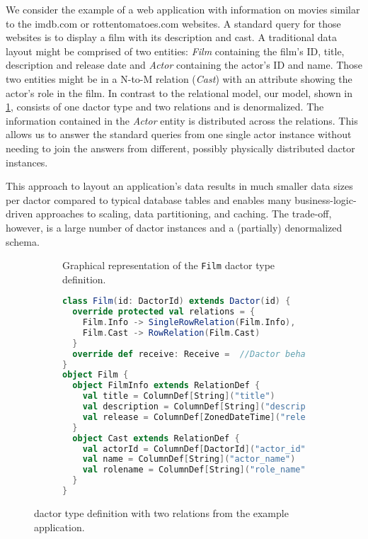     We consider the example of a web application with information on movies similar to the imdb.com or rottentomatoes.com websites.
    A standard query for those websites is to display a film with its description and cast.
    A traditional data layout might be comprised of two entities: \textit{Film} containing the film's ID, title, description and release date and \textit{Actor} containing the actor's ID and name.
    Those two entities might be in a N-to-M relation (\textit{Cast}) with an attribute showing the actor's role in the film.
    In contrast to the relational model, our model, shown in \cref{fig:film_diagram}, consists of one \gls{dactor} type and two \glspl{relation} and is denormalized.
    The information contained in the \textit{Actor} entity is distributed across the  \glspl{relation}.
    This allows us to answer the standard queries from one single actor instance without needing to join the answers from different, possibly physically distributed \gls{dactor} instances.

    This approach to layout an application's data results in much smaller data sizes per \gls{dactor} compared to typical database tables and enables many business-logic-driven approaches to scaling, data partitioning, and caching.
    The trade-off, however, is a large number of \gls{dactor} instances and a (partially) denormalized schema.

    \begin{figure}
      \centering

      \begin{subfigure}[b]{0.44\textwidth}
        \centering
        
        \caption{Graphical representation of the \texttt{Film} \gls{dactor} type definition.}
        \label{fig:film_diagram}
      \end{subfigure}\hfill
      \begin{subfigure}[b]{0.54\textwidth}
        \centering
        \scriptsize
\begin{lstlisting}[language=Scala]
class Film(id: DactorId) extends Dactor(id) {
  override protected val relations = {
    Film.Info -> SingleRowRelation(Film.Info),
    Film.Cast -> RowRelation(Film.Cast)
  }
  override def receive: Receive =  //Dactor behavior
}
object Film {
  object FilmInfo extends RelationDef {
    val title = ColumnDef[String]("title")
    val description = ColumnDef[String]("description")
    val release = ColumnDef[ZonedDateTime]("release")
  }
  object Cast extends RelationDef {
    val actorId = ColumnDef[DactorId]("actor_id")
    val name = ColumnDef[String]("actor_name")
    val rolename = ColumnDef[String]("role_name")
  }
}
\end{lstlisting}
        \label{lst:film_definition}
      \end{subfigure}
      \caption[\texttt{Film} Dactor type definition with two relations of the example application.]{ \gls{dactor} type definition with two relations from the example application.}
      \label{fig:film_dactor_definition}
    \end{figure}

